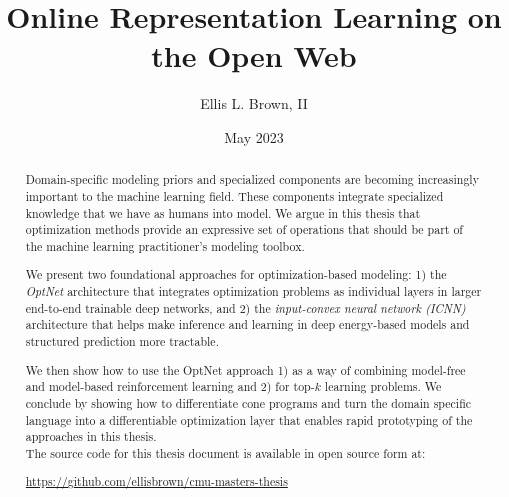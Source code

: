 \documentclass[12pt,masters]{cmuthesis}
\begin{document}
\frontmatter

\pagestyle{empty}

\title{{\bf Online Representation Learning on the Open Web}}
\author{Ellis L. Brown, II}
\date{May 2023}


\support{}
\disclaimer{}


\maketitle


\begin{abstract}
    Domain-specific modeling priors and specialized components are
    becoming increasingly important to the machine learning field.
    These components integrate specialized knowledge that we have
    as humans into model.
    We argue in this thesis that optimization methods provide an
    expressive set of operations that should be part of the
    machine learning practitioner's modeling toolbox.

    We present two foundational approaches for optimization-based modeling:
    1) the \emph{OptNet} architecture that integrates
    optimization problems as individual layers in larger end-to-end
    trainable deep networks, and
    2) the \emph{input-convex neural network (ICNN)}
    architecture that helps make inference and learning in deep
    energy-based models and structured prediction more tractable.

    We then show how to use the OptNet approach
    1) as a way of combining model-free and model-based reinforcement
    learning and
    2) for top-$k$ learning problems.
    We conclude by showing how to differentiate cone programs
    and turn the \cvxpy domain specific language into
    a differentiable optimization layer that enables rapid prototyping of
    the approaches in this thesis. \\

    \noindent
    The source code for this thesis document is available in open source form at:
    \begin{center}
        \url{https://github.com/ellisbrown/cmu-masters-thesis}
    \end{center}
\end{abstract}
\end{document}
